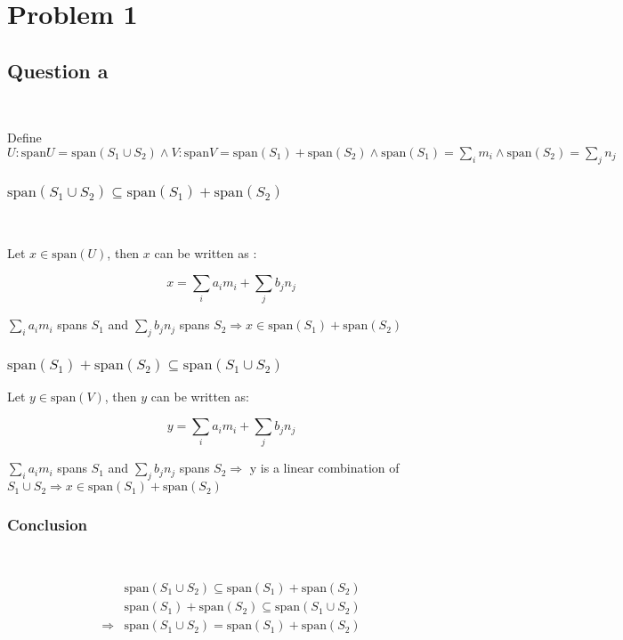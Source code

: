 \documentclass{article}
\begin{document}
\section{Problem 1}

\subsection{Question a}

~

Define $U : \mathrm{span} U = \mathrm{span} (S_1 \cup S_2) \land V : \mathrm{span} V=\mathrm{span}(S_1)+\mathrm{span}(S_2) \land \mathrm{span}(S_1)=\sum_{i}m_i \land \mathrm{span}(S_2)=\sum_{j}n_j$

\subsubsection{$\mathrm{span} (S_1 \cup S_2) \subseteq \mathrm{span}(S_1)+\mathrm{span}(S_2)$}

~

Let $x\in \mathrm{span}(U)$, then $x$ can be written as :

\[x=\sum_{i}a_i m_i+\sum_{j}b_j n_j\]

$\sum_{i}a_i m_i$ spans $S_1$ and $\sum_{j}b_j n_j$ spans $S_2 \Rightarrow x \in \mathrm{span}(S_1)+\mathrm{span}(S_2)$

\subsubsection{$\mathrm{span}(S_1)+\mathrm{span}(S_2) \subseteq\mathrm{span} (S_1 \cup S_2)$}

Let $y \in \mathrm{span}(V)$, then $y$ can be written as:

\[y=\sum_{i}a_i m_i+\sum_{j}b_j n_j\]

$\sum_{i}a_i m_i$ spans $S_1$ and $\sum_{j}b_j n_j$ spans $S_2 \Rightarrow$ y is a linear combination of $S_1 \cup S_2 \Rightarrow x \in \mathrm{span}(S_1)+\mathrm{span}(S_2)$

\subsubsection{Conclusion}

~

\begin{equation}
\tag{1.1.3}
\begin{split}
&\mathrm{span} (S_1 \cup S_2) \subseteq \mathrm{span}(S_1)+\mathrm{span}(S_2)\\
&\mathrm{span}(S_1)+\mathrm{span}(S_2) \subseteq\mathrm{span} (S_1 \cup S_2)\\
\Rightarrow & \mathrm{span} (S_1 \cup S_2) = \mathrm{span}(S_1)+\mathrm{span}(S_2)
\end{split}
\end{equation}
\end{document}
